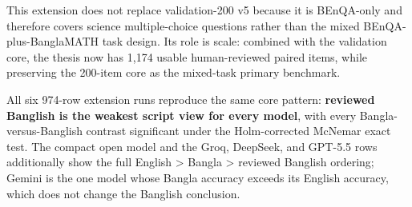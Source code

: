 This extension does not replace validation-200 v5 because it is BEnQA-only and therefore covers science multiple-choice questions rather than the mixed BEnQA-plus-BanglaMATH task design. Its role is scale: combined with the validation core, the thesis now has 1,174 usable human-reviewed paired items, while preserving the 200-item core as the mixed-task primary benchmark.

\begin{table}[H]
\centering
\caption{BEnQA human-reviewed gold 974 scale results. The final column reports the Holm-adjusted McNemar exact p-value for the Bangla-versus-Banglish contrast.}
\label{tab:ext974}
\small
{}
\end{table}

All six 974-row extension runs reproduce the same core pattern: \textbf{reviewed Banglish is the weakest script view for every model}, with every Bangla-versus-Banglish contrast significant under the Holm-corrected McNemar exact test. The compact open model and the Groq, DeepSeek, and GPT-5.5 rows additionally show the full English \textgreater{} Bangla \textgreater{} reviewed Banglish ordering; Gemini is the one model whose Bangla accuracy exceeds its English accuracy, which does not change the Banglish conclusion.


